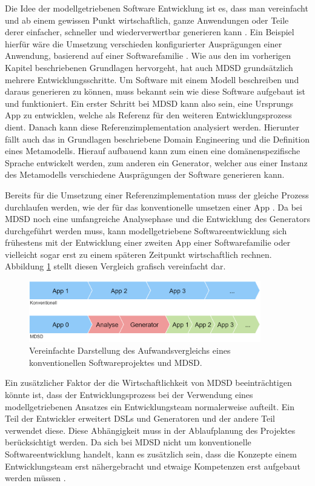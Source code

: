 \documentclass[12pt,oneside,a4paper,parskip]{scrbook}
\begin{document}
Die Idee der modellgetriebenen Software Entwicklung ist es, dass man vereinfacht und ab einem gewissen Punkt wirtschaftlich, ganze Anwendungen oder Teile derer einfacher, schneller und wiederverwertbar generieren kann \cite[S. 14f.]{stahl2007}. Ein Beispiel hierfür wäre die Umsetzung verschieden konfigurierter Ausprägungen einer Anwendung, basierend auf einer Softwarefamilie \cite[S. 237ff.]{stahl2007}. Wie aus den im vorherigen Kapitel beschriebenen Grundlagen hervorgeht, hat auch MDSD grundsätzlich mehrere Entwicklungsschritte. Um Software mit einem Modell beschreiben und daraus generieren zu können, muss bekannt sein wie diese Software aufgebaut ist und funktioniert. Ein erster Schritt bei MDSD kann also sein, eine Ursprungs App zu entwicklen, welche als Referenz für den weiteren Entwicklungsprozess dient. Danach kann diese Referenzimplementation analysiert werden. Hierunter fällt auch das in Grundlagen beschriebene Domain Engineering und die Definition eines Metamodells. Hierauf aufbauend kann zum einen eine domänenspezifische Sprache entwickelt werden, zum anderen ein Generator, welcher aus einer Instanz des Metamodells verschiedene Ausprägungen der Software generieren kann.

Bereits für die Umsetzung einer Referenzimplementation muss der gleiche Prozess durchlaufen werden, wie der für das konventionelle umsetzen einer App \cite[S. 219f.]{stahl2007}. Da bei MDSD noch eine umfangreiche Analysephase und die Entwicklung des Generators durchgeführt werden muss, kann modellgetriebene Softwareentwicklung sich frühestens mit der Entwicklung einer zweiten App einer Softwarefamilie oder vielleicht sogar erst zu einem späteren Zeitpunkt wirtschaftlich rechnen. Abbildung \ref{fig:vgl1} stellt diesen Vergleich grafisch vereinfacht dar.

\begin{figure}[htbp]
	\centering
	\includegraphics[width=0.9\textwidth]{bilder/vergleich_1}
	\caption{Vereinfachte Darstellung des Aufwandsvergleichs eines konventionellen Softwareprojektes und MDSD.}
	\label{fig:vgl1}
\end{figure}

Ein zusätzlicher Faktor der die Wirtschaftlichkeit von MDSD beeinträchtigen könnte ist, dass der Entwicklungsprozess bei der Verwendung eines modellgetriebenen Ansatzes ein Entwicklungsteam normalerweise aufteilt. Ein Teil der Entwickler erweitert DSLs und Generatoren und der andere Teil verwendet diese. Diese Abhängigkeit muss in der Ablaufplanung des Projektes berücksichtigt werden. Da sich bei MDSD nicht um konventionelle Softwareentwicklung handelt, kann es zusätzlich sein, dass die Konzepte einem Entwicklungsteam erst nähergebracht und etwaige Kompetenzen erst aufgebaut werden müssen \cite[S. 44ff.]{voelter2013}.
\end{document}
